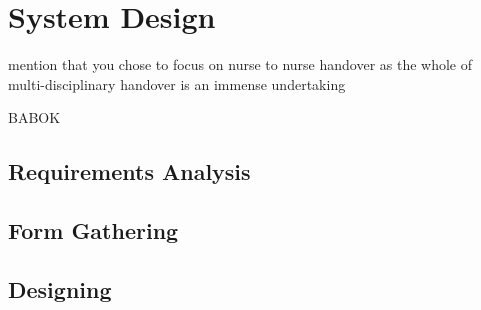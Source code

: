 \section{System Design}
mention that you chose to focus on nurse to nurse handover as the whole of multi-disciplinary handover is an immense undertaking

BABOK

\subsection{Requirements Analysis}

\subsection{Form Gathering}

\subsection{Designing}

